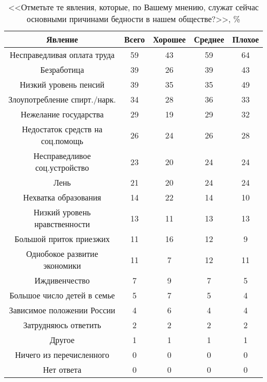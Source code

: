 \begin{table}[H]
    \centering
    \begin{tabular}{|c|c|c|c|c|}
        \hline
        Явление & Всего & Хорошее & Среднее & Плохое \\ \hline \hline
        Несправедливая оплата труда & 59 & 43 & 59 & 64 \\ \hline
        Безработица & 39 & 26 & 39 & 43 \\ \hline
        Низкий уровень пенсий & 39 & 35 & 35 & 49 \\ \hline
        Злоупотребление спирт./нарк. & 34 & 28 & 36 & 33 \\ \hline
        Нежелание государства & 29 & 19 & 29 & 32 \\ \hline
        Недостаток средств на соц.помощь & 26 & 24 & 26 & 28 \\ \hline
        Несправедливое соц.устройство & 23 & 20 & 24 & 24 \\ \hline
        Лень & 21 & 20 & 24 & 24 \\ \hline
        Нехватка образования & 14 & 22 & 14 & 10 \\ \hline
        Низкий уровень нравственности & 13 & 11 & 13 & 13 \\ \hline
        Большой приток приезжих & 11 & 16 & 12 & 9 \\ \hline
        Однобокое развитие экономики & 11 & 7 & 12 & 11 \\ \hline
        Иждивенчество & 7 & 9 & 7 & 5 \\ \hline
        Большое число детей в семье & 5 & 7 & 5 & 4 \\ \hline
        Зависимое положении России & 4 & 6 & 4 & 4 \\ \hline
        Затрудняюсь ответить & 2 & 2 & 2 & 2 \\ \hline
        Другое & 1 & 1 & 1 & 1 \\ \hline
        Ничего из перечисленного & 0 & 0 & 0 & 0 \\ \hline
        Нет ответа & 0 & 0 & 0 & 0\\ \hline
    \end{tabular}
    \caption{<<Отметьте те явления, которые, по Вашему мнению, служат сейчас 
        основными причинами бедности в нашем обществе?>>, \%}
\end{table}


